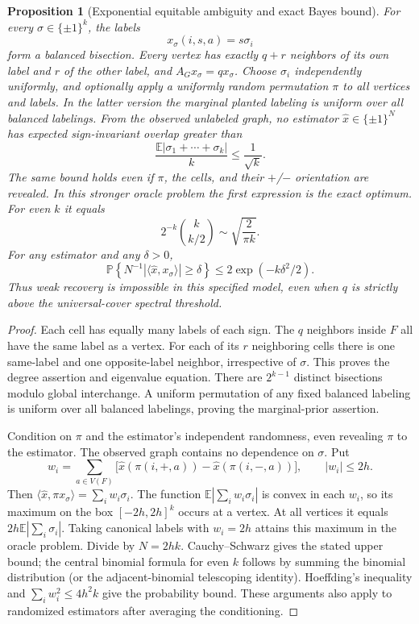 \documentclass[11pt]{article}
\newtheorem{proposition}{Proposition}
\newcommand{\E}{\mathbb E}
\newcommand{\PP}{\mathbb P}
\begin{document}
\begin{proposition}[Exponential equitable ambiguity and exact Bayes bound]
For every $\sigma\in\{\pm1\}^k$, the labels
\[
 x_\sigma(i,s,a)=s\sigma_i
\]
form a balanced bisection. Every vertex has exactly $q+r$ neighbors of its
own label and $r$ of the other label, and $A_Gx_\sigma=qx_\sigma$.
Choose $\sigma_i$ independently uniformly, and optionally apply a uniformly
random permutation $\pi$ to all vertices and labels. In the latter version
the marginal planted labeling is uniform over all balanced labelings.
From the observed
unlabeled graph, no estimator $\widehat x\in\{\pm1\}^N$ has expected
sign-invariant overlap greater than
\[
 \frac{\E|\sigma_1+\cdots+\sigma_k|}{k}\leq\frac1{\sqrt{k}}.
\]
The same bound holds even if $\pi$, the cells, and their $+$/$-$ orientation
are revealed. In this stronger oracle problem the first expression is the
exact optimum. For even $k$ it equals
\[
 2^{-k}\binom{k}{k/2}\sim\sqrt{\frac{2}{\pi k}}.
\]
For any estimator and any $\delta>0$,
\[
 \PP\left\{N^{-1}|\langle\widehat x,x_\sigma\rangle|\geq\delta\right\}
 \leq 2\exp(-k\delta^2/2).
\]
Thus weak recovery is impossible in this specified model, even when $q$
is strictly above the universal-cover spectral threshold.
\end{proposition}
\begin{proof}
Each cell has equally many labels of each sign. The $q$ neighbors inside
$F$ all have the same label as a vertex. For each of its $r$ neighboring
cells there is one same-label and one opposite-label neighbor, irrespective
of $\sigma$. This proves the degree assertion and eigenvalue equation.
There are $2^{k-1}$ distinct bisections modulo global interchange. A uniform
permutation of any fixed balanced labeling is uniform over all balanced
labelings, proving the marginal-prior assertion.

Condition on $\pi$ and the estimator's independent randomness, even revealing
$\pi$ to the estimator. The observed graph contains no dependence on
$\sigma$. Put
\[
 w_i=\sum_{a\in V(F)}\bigl[\widehat x(\pi(i,+,a))-
                   \widehat x(\pi(i,-,a))\bigr],\qquad |w_i|\leq2h.
\]
Then $\langle\widehat x,\pi x_\sigma\rangle=\sum_iw_i\sigma_i$.
The function $\E|\sum_iw_i\sigma_i|$ is convex in each $w_i$, so its maximum
on the box $[-2h,2h]^k$ occurs at a vertex. At all vertices it equals
$2h\E|\sum_i\sigma_i|$. Taking canonical labels with $w_i=2h$ attains
this maximum in the oracle problem. Divide by $N=2hk$. Cauchy--Schwarz
gives the stated upper bound; the central binomial formula for even $k$
follows by summing the binomial distribution (or the adjacent-binomial
telescoping identity). Hoeffding's inequality and
$\sum_iw_i^2\leq4h^2k$ give the probability bound. These arguments also
apply to randomized estimators after averaging the conditioning.
\end{proof}
\end{document}
